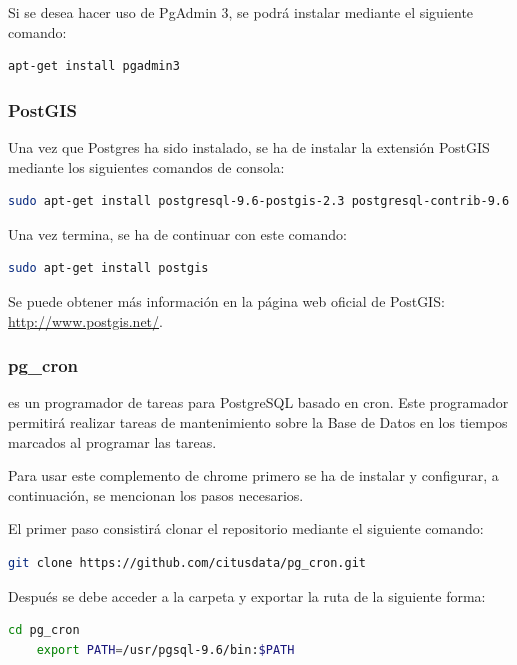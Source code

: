 Si se desea hacer uso de PgAdmin 3, se podrá instalar mediante el siguiente comando:
\begin{lstlisting}[language=bash]
	apt-get install pgadmin3
\end{lstlisting}

\subsubsection{PostGIS}

Una vez que Postgres ha sido instalado, se ha de instalar la extensión PostGIS mediante los siguientes comandos de consola:

\begin{lstlisting}[language=bash]
	sudo apt-get install postgresql-9.6-postgis-2.3 postgresql-contrib-9.6
\end{lstlisting}
Una vez termina, se ha de continuar con este comando:

\begin{lstlisting}[language=bash]
	sudo apt-get install postgis
\end{lstlisting}

Se puede obtener más información en la página web oficial de PostGIS: \url{http://www.postgis.net/}.

\subsubsection{pg\_cron}

 \cite{pgcron:info} es un programador de tareas para PostgreSQL basado en cron. Este programador permitirá realizar tareas de mantenimiento sobre la Base de Datos en los tiempos marcados al programar las tareas.

Para usar este complemento de chrome primero se ha de instalar y configurar, a continuación, se mencionan los pasos necesarios.


El primer paso consistirá clonar el repositorio mediante el siguiente comando:

\begin{lstlisting}[language=bash]
	git clone https://github.com/citusdata/pg_cron.git
\end{lstlisting}

Después se debe acceder a la carpeta y exportar la ruta de la siguiente forma:

\begin{lstlisting}[language=bash]
	cd pg_cron
	export PATH=/usr/pgsql-9.6/bin:$PATH
\end{lstlisting}

